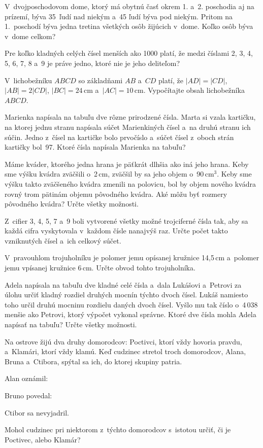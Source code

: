{%
V~dvojposchodovom dome, ktorý má obytnú časť okrem 1. a~2. poschodia aj na prízemí, býva 35~ľudí nad niekým a~45 ľudí býva pod niekým.
Pritom na 1.~poschodí býva jedna tretina všetkých osôb žijúcich v~dome.
Koľko osôb býva v~dome celkom?}

{%
Pre koľko kladných celých čísel menších ako 1000 platí, že medzi číslami 2, 3, 4, 5, 6, 7, 8 a~9 je práve jedno, ktoré nie je jeho deliteľom?
}

{%
V~lichobežníku $ABCD$ so základňami $AB$ a~$CD$ platí, že $|AD|=|CD|$, $|AB|=2|CD|$, $|BC|= 24$\,cm a~$|AC|= 10$\,cm.
Vypočítajte obsah lichobežníka $ABCD$.}

{%
Marienka napísala na tabuľu dve rôzne prirodzené čísla.
Marta si vzala kartičku, na ktorej jednu stranu napísala súčet Marienkiných čísel a~na druhú stranu ich súčin.
Jedno z~čísel na kartičke bolo prvočíslo a~súčet čísel z~oboch strán kartičky bol~97.
Ktoré čísla napísala Marienka na tabuľu?}

{%
Máme kváder, ktorého jedna hrana je päťkrát dlhšia ako iná jeho hrana.
Keby sme výšku kvádra zväčšili o~2\,cm, zväčšil by sa jeho objem o~90\,cm$^3$.
Keby sme výšku takto zväčšeného kvádra zmenili na polovicu, bol by objem nového kvádra rovný trom pätinám objemu pôvodného kvádra.
Aké môžu byť rozmery pôvodného kvádra?
Určte všetky možnosti.}

{%
Z~cifier 3, 4, 5, 7 a~9 boli vytvorené všetky možné trojciferné čísla tak, aby sa každá cifra vyskytovala v~každom čísle nanajvýš raz.
Určte počet takto vzniknutých čísel a~ich celkový súčet.}

{%
V~pravouhlom trojuholníku je polomer jemu opísanej kružnice 14,5\,cm a~polomer jemu vpísanej kružnice 6\,cm.
Určte obvod tohto trojuholníka.}

{%
Adela napísala na tabuľu dve kladné celé čísla a~dala Lukášovi a~Petrovi za úlohu určiť kladný rozdiel druhých mocnín týchto dvoch čísel.
Lukáš namiesto toho určil druhú mocninu rozdielu daných dvoch čísel.
Vyšlo mu tak číslo o~4\,038 menšie ako Petrovi, ktorý výpočet vykonal správne.
Ktoré dve čísla mohla Adela napísať na tabuľu?
Určte všetky možnosti.
}

{%
Na ostrove žijú dva druhy domorodcov: Poctivci, ktorí vždy hovoria pravdu, a~Klamári, ktorí vždy klamú.
Keď cudzinec stretol troch domorodcov, Alana, Bruna a~Ctibora, spýtal sa ich, do ktorej skupiny patria.
\item Alan oznámil: 
\item Bruno povedal: 
\item Ctibor sa nevyjadril.

Mohol cudzinec pri niektorom z~týchto domorodcov s~istotou určiť, či je Poctivec, alebo Klamár?
}

